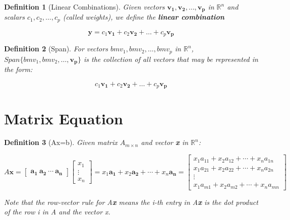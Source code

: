 \documentclass[12pt]{report}
\newtheorem{dfn}{Definition}
\begin{document}
\begin{dfn}[Linear Combinations]
Given vectors $\bm{v_1},\bm{v_2},\ldots ,\bm{v_p}$ in $\mathbb{R}^n$ and scalars $c_1,c_2, \ldots ,c_p$ (called weights), we define the \textbf{linear combination}

\begin{equation}\bm{y}=c_1\bm{v_1}+c_2\bm{v_2}+\ldots +c_p\bm{v_p}\end{equation}
\end{dfn}

\begin{dfn}[Span]
For vectors $bm{v_1},bm{v_2},\ldots , bm{v_p}$ in $\mathbb{R}^n$, $Span\{bm{v_1},bm{v_2},\ldots , \bm{v_p}\}$ is the collection of all vectors that may be represented in the form:

\begin{equation}c_1\bm{v_1}+c_2\bm{v_2}+\ldots +c_p\bm{v_p}\end{equation}
\end{dfn}

\section{Matrix Equation}

\begin{dfn}[Ax=b]
Given matrix $A_{m\times n}$ and vector \textbf{x} in $\mathbb{R}^n$:

\begin{equation}
A\bm{x}=
\begin{bmatrix}
\bm{a_1}\:\bm{a_2}\:\cdots\:\bm{a_n}
\end{bmatrix}
\begin{bmatrix}
x_1 \\ \vdots \\ x_n
\end{bmatrix}
=x_1\bm{a_1}+x_2\bm{a_2}+\cdots+x_n\bm{a_n}
=\begin{bmatrix}
x_1a_{11}+x_2a_{12}+\cdots+x_na_{1n} \\
x_1a_{21}+x_2a_{22}+\cdots+x_na_{2n} \\
\vdots \\
x_1a_{m1}+x_2a_{m2}+\cdots+x_na_{mn}
\end{bmatrix}
\end{equation}

Note that the row-vector rule for A\textbf{x} means the i-th entry in A\textbf{x} is the dot product of the row i in A and the vector x.

\end{dfn}
\end{document}
